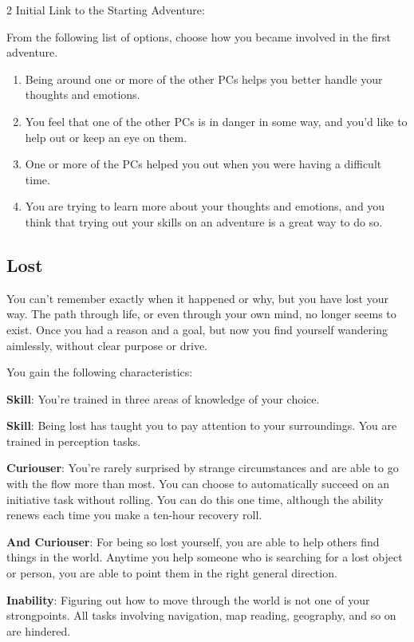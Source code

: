 \begin{multicols}{2}
Initial Link to the Starting Adventure:

From the following list of options, choose how you became involved in the first adventure.
\begin{enumerate}
\item Being around one or more of the other PCs helps you better handle your thoughts and emotions.
\item You feel that one of the other PCs is in danger in some way, and you’d like to help out or keep an eye on them.
\item One or more of the PCs helped you out when you were having a difficult time.
\item You are trying to learn more about your thoughts and emotions, and you think that trying out your skills on an adventure is a great way to do so.
\end{enumerate}

\subsection{Lost}

You can’t remember exactly when it happened or why, but you have lost your way. The path through life, or even through your own mind, no longer seems to exist. Once you had a reason and a goal, but now you find yourself wandering aimlessly, without clear purpose or drive.

You gain the following characteristics:

\textbf{Skill}: You’re trained in three areas of knowledge of your choice.

\textbf{Skill}: Being lost has taught you to pay attention to your surroundings. You are trained in perception tasks.

\textbf{Curiouser}: You’re rarely surprised by strange circumstances and are able to go with the flow more than most. You can choose to automatically succeed on an initiative task without rolling. You can do this one time, although the ability renews each time you make a ten-hour recovery roll.

\textbf{And Curiouser}: For being so lost yourself, you are able to help others find things in the world. Anytime you help someone who is searching for a lost object or person, you are able to point them in the right general direction.

\textbf{Inability}: Figuring out how to move through the world is not one of your strongpoints. All tasks involving navigation, map reading, geography, and so on are hindered.


\end{multicols}
